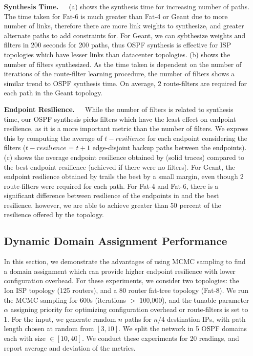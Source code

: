 \noindent\textbf{Synthesis Time.}~~~(a) 
shows the synthesis time for increasing number of paths. 
The time taken for Fat-6 is much greater than Fat-4 or Geant
due to more number of links, therefore there are more link weights
to synthesize, and greater alternate paths to add constraints for. 
For Geant, we can sybthesize weights and filters in 200 seconds 
for 200 paths, thus OSPF synthesis is effective for ISP topologies
which have lesser links than datacenter topologies. 
(b) shows the number of filters synthesized. 
As the time taken is dependent on the number of iterations of
the route-filter learning procedure, the number of filters
shows a similar trend to OSPF synthesis time. On average, 2 route-filters
are required for each path in the Geant topology. 

\noindent\textbf{Endpoint Resilience.}~~~While the number of 
filters is related to synthesis time, our OSPF synthesis picks
filters which have the least effect on endpoint resilience, as it  
is a more important metric than the number of filters. We express this
by computing the average of $t-resilience$ for each endpoint considering
the filters ($t-resilience$ = $t+1$ edge-disjoint backup paths between the 
endpoints).
(c) shows the average
endpoint resilience obtained by \name (solid traces) 
compared to the best endpoint resilience (achieved
if there were no filters). For Geant, the endpoint 
resilience obtained by \name trails the best by a small margin,
even though 2 route-filters were required for each path. For
Fat-4 and Fat-6, there is a significant difference between resilience
of the endpoints in \name and the best resilience, 
however, we are able to achieve greater than
50 percent of the resilience offered by the topology. 

\subsection{Dynamic Domain Assignment Performance} \label{sec:mcmceval}
In this section, we demonstrate the advantages of using MCMC sampling
to find a domain assignment which can provide higher endpoint resilience
with lower configuration overhead. For these experiments, we consider 
two topologies: the Ion ISP topology (125 routers), and a 80 router 
fat-tree topology (Fat-8). We run the MCMC sampling for 600s (iterations
$>$ 100,000), and the tunable parameter $\alpha$ assigning priority for 
optimizing configuration overhead or route-filters is set to 1. For 
the input, we generate random $n$ paths for $n/4$ destination IPs, with
path length chosen at random from $[3,10]$. We split the network
in 5 OSPF domains each with size $\in [10,40]$. We conduct these
experiments for 20 readings, and report average and deviation of the metrics. 

